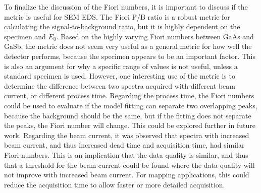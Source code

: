 To finalize the discussion of the Fiori numbers, it is important to discuss if the metric is useful for SEM EDS.
The Fiori P/B ratio is a robust metric for calculating the signal-to-background ratio, but it is highly dependent on the specimen and $E_0$.
Based on the highly varying Fiori numbers between GaAs and GaSb, the metric does not seem very useful as a general metric for how well the detector performs, because the specimen appears to be an important factor.
This is also an argument for why a specific range of values is not useful, unless a standard specimen is used.
However, one interesting use of the metric is to determine the difference between two spectra acquired with different beam current, or different process time.
Regarding the process time, the Fiori numbers could be used to evaluate if the model fitting can separate two overlapping peaks, because the background should be the same, but if the fitting does not separate the peaks, the Fiori number will change.
This could be explored further in future work.
Regarding the beam current, it was observed that spectra with increased beam current, and thus increased dead time and acquisition time, had similar Fiori numbers.
This is an implication that the data quality is similar, and thus that a threshold for the beam current could be found where the data quality will not improve with increased beam current.
For mapping applications, this could reduce the acquisition time to allow faster or more detailed acquisition.







